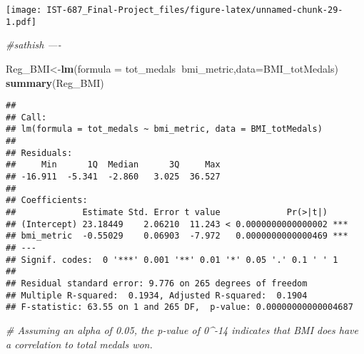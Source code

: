 \documentclass[]{article}
\newenvironment{Shaded}{\begin{snugshade}}{\end{snugshade}}
\newcommand{\CommentTok}[1]{\textcolor[rgb]{0.56,0.35,0.01}{\textit{#1}}}
\newcommand{\DataTypeTok}[1]{\textcolor[rgb]{0.13,0.29,0.53}{#1}}
\newcommand{\KeywordTok}[1]{\textcolor[rgb]{0.13,0.29,0.53}{\textbf{#1}}}
\newcommand{\NormalTok}[1]{#1}
\newcommand{\OperatorTok}[1]{\textcolor[rgb]{0.81,0.36,0.00}{\textbf{#1}}}
\newcommand{\StringTok}[1]{\textcolor[rgb]{0.31,0.60,0.02}{#1}}
\begin{document}
\begin{Shaded}
\end{Shaded}

\texttt{[image: IST-687\_Final-Project\_files/figure-latex/unnamed-chunk-29-1.pdf]}

\begin{Shaded}
\begin{Highlighting}[]
\CommentTok{#sathish ----}

\NormalTok{Reg_BMI<-}\KeywordTok{lm}\NormalTok{(}\DataTypeTok{formula =}\NormalTok{ tot_medals}\OperatorTok{~}\NormalTok{bmi_metric,}\DataTypeTok{data=}\NormalTok{BMI_totMedals)}
\KeywordTok{summary}\NormalTok{(Reg_BMI)}
\end{Highlighting}
\end{Shaded}

\begin{verbatim}
## 
## Call:
## lm(formula = tot_medals ~ bmi_metric, data = BMI_totMedals)
## 
## Residuals:
##     Min      1Q  Median      3Q     Max 
## -16.911  -5.341  -2.860   3.025  36.527 
## 
## Coefficients:
##             Estimate Std. Error t value             Pr(>|t|)    
## (Intercept) 23.18449    2.06210  11.243 < 0.0000000000000002 ***
## bmi_metric  -0.55029    0.06903  -7.972   0.0000000000000469 ***
## ---
## Signif. codes:  0 '***' 0.001 '**' 0.01 '*' 0.05 '.' 0.1 ' ' 1
## 
## Residual standard error: 9.776 on 265 degrees of freedom
## Multiple R-squared:  0.1934, Adjusted R-squared:  0.1904 
## F-statistic: 63.55 on 1 and 265 DF,  p-value: 0.00000000000004687
\end{verbatim}

\begin{Shaded}
\begin{Highlighting}[]
\CommentTok{#  Assuming an alpha of 0.05, the p-value of 0^-14 indicates that BMI does have a correlation to total medals won.  }
\end{Highlighting}
\end{Shaded}

\begin{Shaded}
\end{Shaded}
\end{document}
